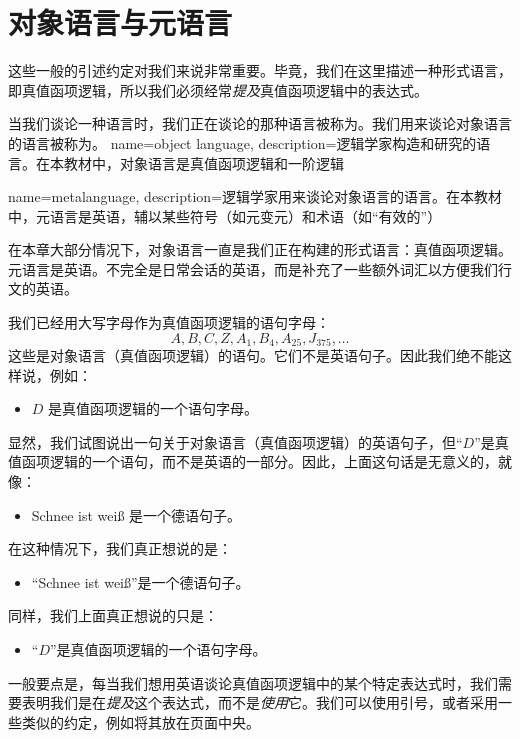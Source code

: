 \section{对象语言与元语言}
这些一般的引述约定对我们来说非常重要。毕竟，我们在这里描述一种形式语言，即真值函项逻辑，所以我们必须经常\emph{提及}真值函项逻辑中的表达式。

当我们谈论一种语言时，我们正在谈论的那种语言被称为。我们用来谈论对象语言的语言被称为。
\label{def.metalanguage}
{
name=object language,
description={逻辑学家构造和研究的语言。在本教材中，对象语言是真值函项逻辑和一阶逻辑}
}

{
name=metalanguage,
description={逻辑学家用来谈论对象语言的语言。在本教材中，元语言是英语，辅以某些符号（如元变元）和术语（如“有效的”）}
}

在本章大部分情况下，对象语言一直是我们正在构建的形式语言：真值函项逻辑。元语言是英语。不完全是日常会话的英语，而是补充了一些额外词汇以方便我们行文的英语。

我们已经用大写字母作为真值函项逻辑的语句字母：
	$$A, B, C, Z, A_1, B_4, A_{25}, J_{375},\ldots$$
这些是对象语言（真值函项逻辑）的语句。它们不是英语句子。因此我们绝不能这样说，例如：
\begin{itemize}
		\item $D$ 是真值函项逻辑的一个语句字母。
	\end{itemize}

显然，我们试图说出一句关于对象语言（真值函项逻辑）的英语句子，但“$D$”是真值函项逻辑的一个语句，而不是英语的一部分。因此，上面这句话是无意义的，就像：
\begin{itemize}
		\item Schnee ist weiß 是一个德语句子。
	\end{itemize}

在这种情况下，我们真正想说的是：
\begin{itemize}
		\item“Schnee ist weiß”是一个德语句子。
	\end{itemize}

同样，我们上面真正想说的只是：
\begin{itemize}
		\item“$D$”是真值函项逻辑的一个语句字母。
	\end{itemize}

一般要点是，每当我们想用英语谈论真值函项逻辑中的某个特定表达式时，我们需要表明我们是在\emph{提及}这个表达式，而不是\emph{使用}它。我们可以使用引号，或者采用一些类似的约定，例如将其放在页面中央。

